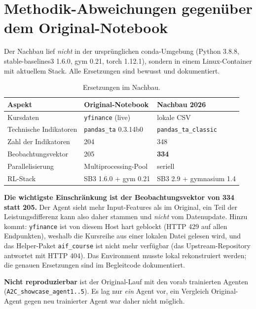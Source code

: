 \section{Methodik-Abweichungen gegenüber dem Original-Notebook}
\label{sec:abweichungen}

Der Nachbau lief \emph{nicht} in der ursprünglichen conda-Umgebung (Python 3.8.8,
stable-baselines3 1.6.0, gym 0.21, torch 1.12.1), sondern in einem Linux-Container mit
aktuellem Stack. Alle Ersetzungen sind bewusst und dokumentiert.

\begin{table}[H]
  \centering
  \caption{Ersetzungen im Nachbau.}
  \label{tab:abweichungen}
  \begin{tabular}{lll}
    \toprule
    Aspekt & Original-Notebook & Nachbau 2026\\
    \midrule
    Kursdaten            & \texttt{yfinance} (live)      & lokale CSV\\
    Technische Indikatoren & \texttt{pandas\_ta} 0.3.14b0 & \texttt{pandas\_ta\_classic}\\
    Zahl der Indikatoren & 204                          & 348\\
    Beobachtungsvektor   & 205                          & \textbf{334}\\
    Parallelisierung     & Multiprocessing-Pool         & seriell\\
    RL-Stack             & SB3 1.6.0 + gym 0.21         & SB3 2.9 + gymnasium 1.4\\
    \bottomrule
  \end{tabular}
\end{table}

\textbf{Die wichtigste Einschränkung ist der Beobachtungsvektor von 334 statt 205.} Der Agent
sieht mehr Input-Features als im Original, ein Teil der Leistungsdifferenz kann also daher
stammen und \emph{nicht} vom Datenupdate. Hinzu kommt: \texttt{yfinance} ist von diesem Host
hart geblockt (HTTP 429 auf allen Endpunkten), weshalb die Kursreihe aus einer lokalen Datei
gelesen wird, und das Helper-Paket \texttt{aif\_course} ist nicht mehr verfügbar
(das Upstream-Repository antwortet mit HTTP 404). Das Environment musste lokal
rekonstruiert werden; die genauen Ersetzungen sind im Begleitcode dokumentiert.

\textbf{Nicht reproduzierbar} ist der Original-Lauf mit den vorab trainierten Agenten
(\texttt{A2C\_showcase\_agent1..5}). Es lag nur \emph{ein} Agent vor, ein Vergleich
\glqq Original-Agent gegen neu trainierter Agent\grqq{} war daher nicht möglich.
